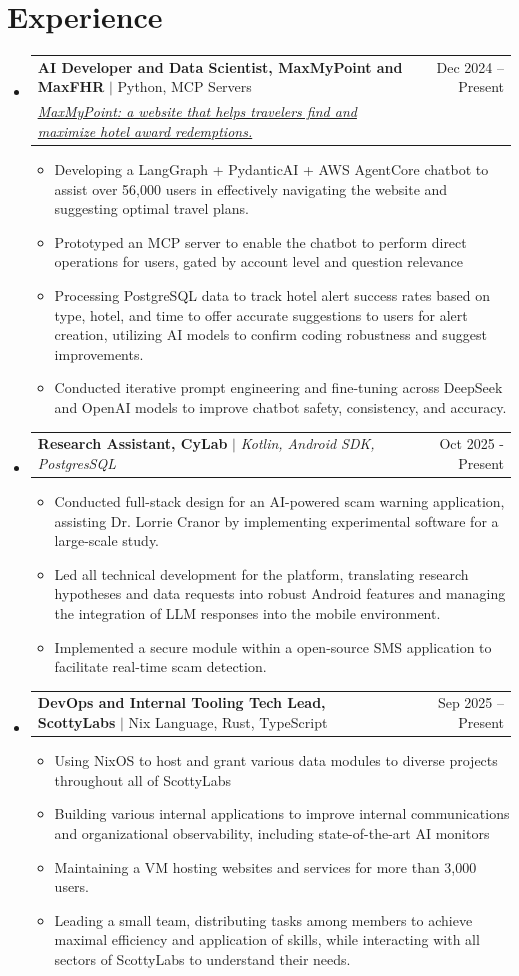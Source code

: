\documentclass[letterpaper,11pt]{article}
\makeatletter
\newcommand{\resumeItem}[1]{
  \item\small{
    {#1 \vspace{-2pt}}
  }
}
\newcommand{\resumeProjectLinkHeading}[3]{
    \item
    \begin{tabular*}{0.97\textwidth}{l@{\extracolsep{\fill}}r}
      \small#1 & #2 \\
      \small#3 \\
    \end{tabular*}\vspace{-7pt}
}
\newcommand{\resumeSmallJob}[2]{
    \item
    \begin{tabular*}{0.97\textwidth}{l@{\extracolsep{\fill}}r}
      \small#1 & #2 \\
    \end{tabular*}\vspace{-7pt}
}
\newcommand{\resumeSubHeadingListStart}{\begin{itemize}[leftmargin=0.15in, label={}]}
\newcommand{\resumeSubHeadingListEnd}{\end{itemize}}
\newcommand{\resumeItemListStart}{\begin{itemize}}
\newcommand{\resumeItemListEnd}{\end{itemize}\vspace{-5pt}}
\makeatother
\begin{document}
\section{Experience}
    \resumeSubHeadingListStart
        \resumeProjectLinkHeading
              {\textbf{AI Developer and Data Scientist, MaxMyPoint and MaxFHR} $|$ Python, MCP Servers}{Dec 2024 -- Present}
            {\href{https://maxmypoint.com/}{\textit{\underline{MaxMyPoint}: a website that helps travelers find and maximize hotel award redemptions.}}}
              \resumeItemListStart
                \resumeItem{Developing a LangGraph + PydanticAI + AWS AgentCore chatbot to assist over 56,000 users in effectively navigating the website and suggesting optimal travel plans.}
                \resumeItem{Prototyped an MCP server to enable the chatbot to perform direct operations for users, gated by account level and question relevance}
                \resumeItem{Processing PostgreSQL data to track hotel alert success rates based on type, hotel, and time to offer accurate suggestions to users for alert creation, utilizing AI models to confirm coding robustness and suggest improvements.}
                \resumeItem{Conducted iterative prompt engineering and fine-tuning across DeepSeek and OpenAI models to improve chatbot safety, consistency, and accuracy.}
              \resumeItemListEnd

        \resumeSmallJob
        {\textbf{Research Assistant, CyLab} $|$ \emph{Kotlin, Android SDK, PostgresSQL}}{Oct 2025 - Present}
          \resumeItemListStart
            \resumeItem{Conducted full-stack design for an AI-powered scam warning application, assisting Dr. Lorrie Cranor by implementing experimental software for a large-scale study.}
            \resumeItem{Led all technical development for the platform, translating research hypotheses and data requests into robust Android features and managing the integration of LLM responses into the mobile environment.}
            \resumeItem{Implemented a secure module within a open-source SMS application to facilitate real-time scam detection.}
          \resumeItemListEnd

        \resumeSmallJob
          {\textbf{DevOps and Internal Tooling Tech Lead, ScottyLabs} $|$ Nix Language, Rust, TypeScript}{Sep 2025 -- Present}
          \resumeItemListStart
            \resumeItem{Using NixOS to host and grant various data modules to diverse projects throughout all of ScottyLabs}
            \resumeItem{Building various internal applications to improve internal communications and organizational observability, including state-of-the-art AI monitors}
            \resumeItem{Maintaining a VM hosting websites and services for more than 3,000 users.}
            \resumeItem{Leading a small team, distributing tasks among members to achieve maximal efficiency and application of skills, while interacting with all sectors of ScottyLabs to understand their needs.}
          \resumeItemListEnd
    \resumeSubHeadingListEnd
\end{document}
